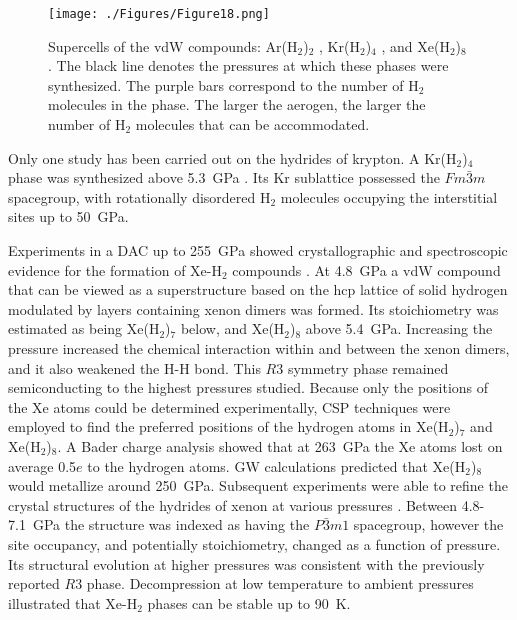 \documentclass[12pt,letterpaper,oneside]{article}
\begin{document}
\begin{figure}[h!]
\begin{center}
\texttt{[image: ./Figures/Figure18.png]}
\end{center}
\caption{Supercells of the vdW compounds: Ar(H$_2$)$_2$ \cite{Loubeyre:1994a, Ji-Ar:2017a}, Kr(H$_2$)$_4$ \cite{Kleppe:2014a}, and Xe(H$_2$)$_8$ \cite{Somayazulu:2010a, Somayazulu:2015a}. The black line denotes the pressures at which these phases were synthesized. The purple bars correspond to the number of H$_2$ molecules in the phase. The larger the aerogen, the larger the number of H$_2$ molecules that can be accommodated.}
\label{fig:Group18}
\end{figure}


Only one study has been carried out on the hydrides of krypton. A Kr(H$_2$)$_4$ phase was synthesized above 5.3~GPa \cite{Kleppe:2014a}. Its Kr sublattice possessed the $Fm\bar{3}m$ spacegroup, with rotationally disordered H$_2$ molecules occupying the interstitial sites up to 50~GPa. 

%
Experiments in a DAC up to 255~GPa showed crystallographic and spectroscopic evidence for the formation of Xe-H$_{2}$ compounds \cite{Somayazulu:2010a}. At 4.8~GPa a vdW compound that can be viewed as a superstructure based on the hcp lattice of solid hydrogen modulated by layers containing xenon dimers was formed. Its stoichiometry  was estimated as being Xe(H$_2$)$_7$ below, and Xe(H$_2$)$_8$ above 5.4~GPa. Increasing the pressure increased the chemical interaction within and between the xenon dimers, and it also weakened the H-H bond. This $R3$ symmetry phase remained semiconducting to the highest pressures studied. Because only the positions of the Xe atoms could be determined experimentally, CSP techniques were employed to find the preferred positions of the hydrogen atoms in Xe(H$_2$)$_7$ and Xe(H$_2$)$_8$\cite{Kaewmaraya:2011a}. A Bader charge analysis showed that at 263~GPa the Xe atoms lost on average 0.5$e$ to the hydrogen atoms. GW calculations predicted that Xe(H$_2$)$_8$ would metallize around 250~GPa.  Subsequent experiments were able to refine the crystal structures of the hydrides of xenon at various pressures \cite{Somayazulu:2015a}. Between 4.8-7.1~GPa the structure was indexed as having the $P\bar{3}m1$ spacegroup, however the site occupancy, and potentially stoichiometry, changed as a function of pressure. Its structural evolution at higher pressures was consistent with the previously reported $R3$ phase. Decompression at low temperature to ambient pressures illustrated that Xe-H$_2$ phases can be stable up to 90~K. 
\end{document}
